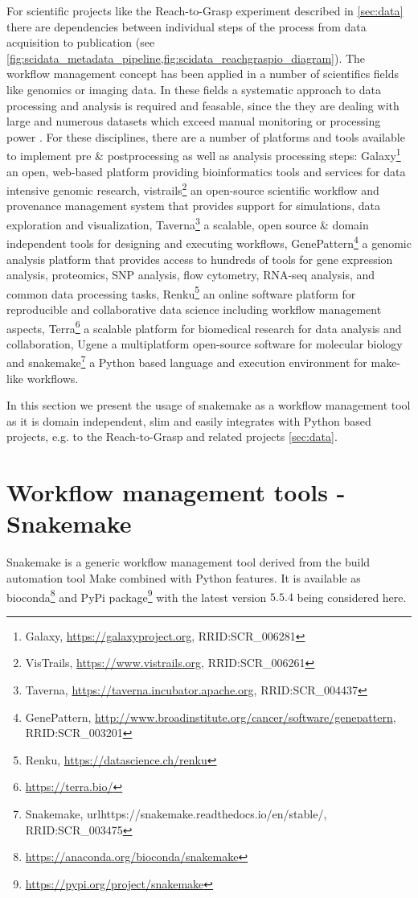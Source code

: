 For scientific projects like the Reach-to-Grasp experiment described in \cref{sec:data} there are dependencies between individual steps of the process from data acquisition to publication (see \cref{fig:scidata_metadata_pipeline,fig:scidata_reachgraspio_diagram}). The workflow management concept has been applied in a number of scientifics fields like genomics or imaging data. In these fields a systematic approach to data processing and analysis is required and feasable, since the they are dealing with large and numerous datasets which exceed manual monitoring or processing power \citep[e.g.][]{Palm_2010}.
For these disciplines, there are a number of platforms and tools available to implement pre \& postprocessing as well as analysis processing steps: Galaxy\footnote{Galaxy, \url{https://galaxyproject.org}, RRID:SCR\_006281} an  open, web-based platform providing bioinformatics tools and services for data intensive genomic research, vistrails\footnote{VisTrails, \url{https://www.vistrails.org}, RRID:SCR\_006261} an open-source scientific workflow and provenance management system that provides support for simulations, data exploration and visualization, Taverna\footnote{Taverna, \url{https://taverna.incubator.apache.org}, RRID:SCR\_004437} a scalable, open source \& domain independent tools for designing and executing workflows,  GenePattern\footnote{GenePattern, \url{http://www.broadinstitute.org/cancer/software/genepattern}, RRID:SCR\_003201} a genomic analysis platform that provides access to hundreds of tools for gene expression analysis, proteomics, SNP analysis, flow cytometry, RNA-seq analysis, and common data processing tasks, Renku\footnote{Renku, \url{https://datascience.ch/renku}} an online software platform for reproducible and collaborative data science including workflow management aspects, Terra\footnote{\url{https://terra.bio/}} a scalable platform  for biomedical research for data analysis and collaboration, Ugene \cite{Okonechnikov_2012} a multiplatform open-source software for molecular biology and snakemake\footnote{Snakemake, url{https://snakemake.readthedocs.io/en/stable/}, RRID:SCR\_003475} a Python based language and execution environment for make-like workflows.

In this section we present the usage of snakemake as a workflow management tool as it is domain independent, slim and easily integrates with Python based projects, e.g. to the Reach-to-Grasp and related projects \cref{sec:data}.

\section{Workflow management tools - Snakemake}
\label{sec:snakemake}
Snakemake is a generic workflow management tool derived from the build automation tool Make combined with Python features. It is available as bioconda\footnote{\url{https://anaconda.org/bioconda/snakemake}} and PyPi package\footnote{\url{https://pypi.org/project/snakemake}} with the latest version $5.5.4$ being considered here.

